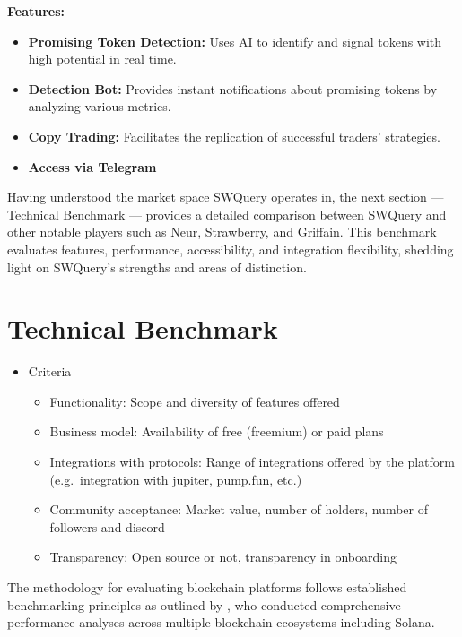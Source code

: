 \documentclass[
]{article}
\providecommand{\tightlist}{%
  \setlength{\itemsep}{0pt}\setlength{\parskip}{0pt}}
\begin{document}
\textbf{Features:}

\begin{itemize}
\tightlist
\item
  \textbf{Promising Token Detection:} Uses AI to identify and signal
  tokens with high potential in real time.
\item
  \textbf{Detection Bot:} Provides instant notifications about promising
  tokens by analyzing various metrics.
\item
  \textbf{Copy Trading:} Facilitates the replication of successful
  traders' strategies.
\item
  \textbf{Access via Telegram}
\end{itemize}



Having understood the market space SWQuery operates in, the next section — Technical Benchmark — provides a detailed comparison between SWQuery and other notable players such as Neur, Strawberry, and Griffain. This benchmark evaluates features, performance, accessibility, and integration flexibility, shedding light on SWQuery’s strengths and areas of distinction.

\hypertarget{technical-benchmark-1}{%
\section{Technical Benchmark}\label{technical-benchmark-1}}

\begin{itemize}
\tightlist
\item
  Criteria

  \begin{itemize}
  \tightlist
  \item
    Functionality: Scope and diversity of features offered
  \item
    Business model: Availability of free (freemium) or paid plans
  \item
    Integrations with protocols: Range of integrations offered by the
    platform (e.g.~integration with jupiter, pump.fun, etc.)
  \item
    Community acceptance: Market value, number of holders, number of
    followers and discord
  \item
    Transparency: Open source or not, transparency in onboarding
  \end{itemize}
\end{itemize}

The methodology for evaluating blockchain platforms follows established
benchmarking principles as outlined by \textcite{wang2022}, who conducted
comprehensive performance analyses across multiple blockchain ecosystems
including Solana.
\end{document}
